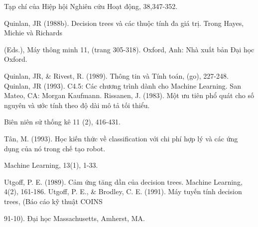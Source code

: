 Tạp chí của Hiệp hội Nghiên cứu Hoạt động, 38,347-352.

Quinlan, JR (1988b). Decision trees và các thuộc tính đa giá trị. Trong Hayes, Michie và Richards

(Eds.), Máy thông minh 11, (trang 305-318). Oxford, Anh: Nhà xuất bản Đại học Oxford.

Quinlan, JR, \& Rivest, R. (1989). Thông tin và Tính toán, (go), 227-248. Quinlan, JR (1993). C4.5: Các chương trình dành cho Machine Learning. San Mateo, CA: Morgan Kaufmann. Rissanen, J. (1983). Một ưu tiên phổ quát cho số nguyên và ước tính theo độ dài mô tả tối thiểu.

Biên niên sử thống kê 11 (2), 416-431.

Tân, M. (1993). Học kiến ​​thức về classification với chi phí hợp lý và các ứng dụng của nó trong chế tạo robot.

Machine Learning, 13(1), 1-33.

Utgoff, P. E. (1989). Cảm ứng tăng dần của decision trees. Machine Learning, 4(2), 161-186. Utgoff, P. E., \& Brodley, C. E. (1991). Máy tuyến tính decision trees, (Báo cáo kỹ thuật COINS

91-10). Đại học Massachusetts, Amherst, MA.

